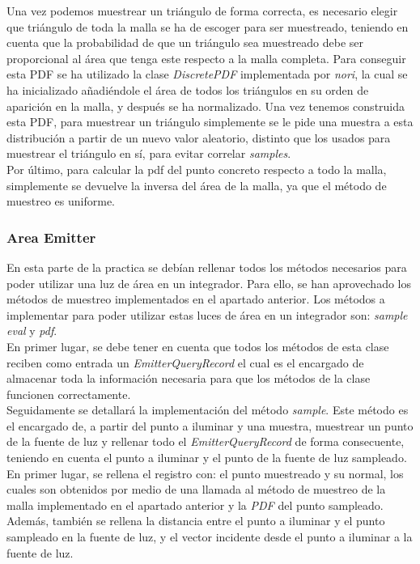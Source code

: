 \documentclass[10pt,oneside,a4paper]{article}
\begin{document}
Una vez podemos muestrear un triángulo de forma correcta, es necesario elegir que triángulo de toda la malla se ha de escoger para ser muestreado, teniendo en cuenta que la probabilidad de que un triángulo sea muestreado debe ser proporcional al área que tenga este respecto a la malla completa. Para conseguir esta PDF se ha utilizado la clase \textit{DiscretePDF} implementada por \textit{nori}, la cual se ha inicializado añadiéndole el área de todos los triángulos en su orden de aparición en la malla, y después se ha normalizado. Una vez tenemos construida esta PDF, para muestrear un triángulo simplemente se le pide una muestra a esta distribución a partir de un nuevo valor aleatorio, distinto que los usados para muestrear el triángulo en sí, para evitar correlar \textit{samples}.\\

Por último, para calcular la pdf del punto concreto respecto a todo la malla, simplemente se devuelve la inversa del área de la malla, ya que el método de muestreo es uniforme.
\subsubsection{Area Emitter}
En esta parte de la practica se debían rellenar todos los métodos necesarios para poder utilizar una luz de área en un integrador. Para ello, se han aprovechado los métodos de muestreo implementados en el apartado anterior. Los  métodos a implementar para poder utilizar estas luces de área en un integrador son: \textit{sample} \textit{eval} y \textit{pdf}.\\

En primer lugar, se debe tener en cuenta que todos los métodos de esta clase reciben como entrada un \textit{EmitterQueryRecord} el cual es el encargado de almacenar toda la información necesaria para que los métodos de la clase funcionen correctamente.\\

Seguidamente se detallará la implementación del método \textit{sample}. Este método es el encargado de, a partir del punto a iluminar y una muestra, muestrear un punto de la fuente de luz y rellenar todo el \textit{EmitterQueryRecord} de forma consecuente, teniendo en cuenta el punto a iluminar y el punto de la fuente de luz sampleado. En primer lugar, se rellena el registro con: el punto muestreado y su normal, los cuales son obtenidos por medio de una llamada al método de muestreo de la malla implementado en el apartado anterior y la \textit{PDF} del punto sampleado. Además, también se rellena la distancia entre el punto a iluminar y el punto sampleado en la fuente de luz, y el vector incidente desde el punto a iluminar a la fuente de luz.\\
\end{document}
